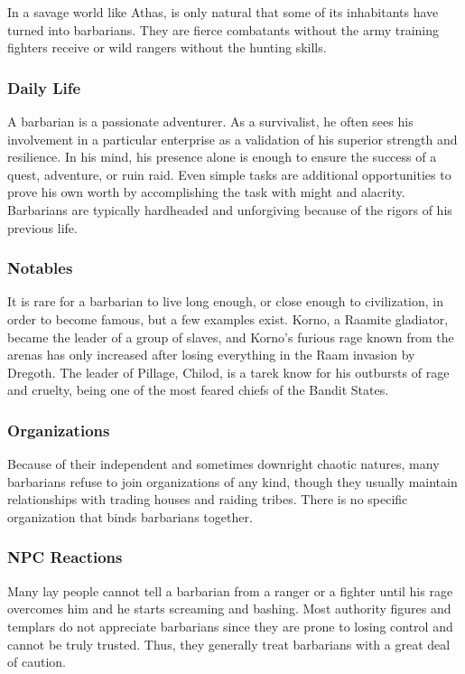In a savage world like Athas, is only natural that some of its inhabitants have turned into barbarians. They are fierce combatants without the army training fighters receive or wild rangers without the hunting skills.

\subsubsection{Daily Life}
A barbarian is a passionate adventurer. As a survivalist, he often sees his involvement in a particular enterprise as a validation of his superior strength and resilience. In his mind, his presence alone is enough to ensure the success of a quest, adventure, or ruin raid. Even simple tasks are additional opportunities to prove his own worth by accomplishing the task with might and alacrity. Barbarians are typically hardheaded and unforgiving because of the rigors of his previous life.

\subsubsection{Notables}
It is rare for a barbarian to live long enough, or close enough to civilization, in order to become famous, but a few examples exist. Korno, a Raamite gladiator, became the leader of a group of slaves, and Korno's furious rage known from the arenas has only increased after losing everything in the Raam invasion by Dregoth. The leader of Pillage, Chilod, is a tarek know for his outbursts of rage and cruelty, being one of the most feared chiefs of the Bandit States.

\subsubsection{Organizations}
Because of their independent and sometimes downright chaotic natures, many barbarians refuse to join organizations of any kind, though they usually maintain relationships with trading houses and raiding tribes. There is no specific organization that binds barbarians together.

\subsubsection{NPC Reactions}
Many lay people cannot tell a barbarian from a ranger or a fighter until his rage overcomes him and he starts screaming and bashing. Most authority figures and templars do not appreciate barbarians since they are prone to losing control and cannot be truly trusted. Thus, they generally treat barbarians with a great deal of caution.

